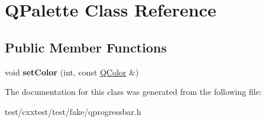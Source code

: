 \hypertarget{classQPalette}{\section{Q\-Palette Class Reference}
\label{classQPalette}
}
\subsection*{Public Member Functions}
\begin{DoxyCompactItemize}
\item 
\hypertarget{classQPalette_a72b0aded50b31aee6685e9026461d585}{void {\bfseries set\-Color} (int, const \hyperlink{classQColor}{Q\-Color} \&)}\label{classQPalette_a72b0aded50b31aee6685e9026461d585}

\end{DoxyCompactItemize}


The documentation for this class was generated from the following file\-:\begin{DoxyCompactItemize}
\item 
test/cxxtest/test/fake/qprogressbar.\-h\end{DoxyCompactItemize}
